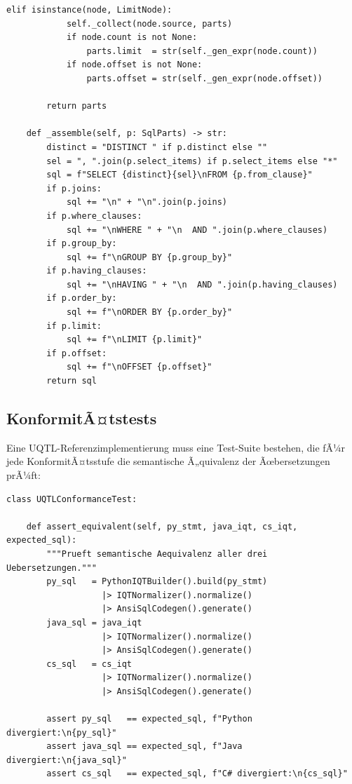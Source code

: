 \begin{lstlisting}[style=pythonstyle, caption={SQL-Codegenerator: IQT nach ANSI SQL},
  label=lst:impl_codegen]
        elif isinstance(node, LimitNode):
            self._collect(node.source, parts)
            if node.count is not None:
                parts.limit  = str(self._gen_expr(node.count))
            if node.offset is not None:
                parts.offset = str(self._gen_expr(node.offset))

        return parts

    def _assemble(self, p: SqlParts) -> str:
        distinct = "DISTINCT " if p.distinct else ""
        sel = ", ".join(p.select_items) if p.select_items else "*"
        sql = f"SELECT {distinct}{sel}\nFROM {p.from_clause}"
        if p.joins:
            sql += "\n" + "\n".join(p.joins)
        if p.where_clauses:
            sql += "\nWHERE " + "\n  AND ".join(p.where_clauses)
        if p.group_by:
            sql += f"\nGROUP BY {p.group_by}"
        if p.having_clauses:
            sql += "\nHAVING " + "\n  AND ".join(p.having_clauses)
        if p.order_by:
            sql += f"\nORDER BY {p.order_by}"
        if p.limit:
            sql += f"\nLIMIT {p.limit}"
        if p.offset:
            sql += f"\nOFFSET {p.offset}"
        return sql
\end{lstlisting}

\subsection{KonformitÃ¤tstests}
\label{subsec:impl_tests}

Eine UQTL-Referenzimplementierung muss eine Test-Suite bestehen, die fÃ¼r
jede KonformitÃ¤tsstufe die semantische Ã„quivalenz der Ãœbersetzungen prÃ¼ft:

\begin{lstlisting}[style=pythonstyle, caption={KonformitÃ¤tstest-Schablone},
  label=lst:impl_test]
class UQTLConformanceTest:

    def assert_equivalent(self, py_stmt, java_iqt, cs_iqt, expected_sql):
        """Prueft semantische Aequivalenz aller drei Uebersetzungen."""
        py_sql   = PythonIQTBuilder().build(py_stmt)
                   |> IQTNormalizer().normalize()
                   |> AnsiSqlCodegen().generate()
        java_sql = java_iqt
                   |> IQTNormalizer().normalize()
                   |> AnsiSqlCodegen().generate()
        cs_sql   = cs_iqt
                   |> IQTNormalizer().normalize()
                   |> AnsiSqlCodegen().generate()

        assert py_sql   == expected_sql, f"Python divergiert:\n{py_sql}"
        assert java_sql == expected_sql, f"Java divergiert:\n{java_sql}"
        assert cs_sql   == expected_sql, f"C# divergiert:\n{cs_sql}"
\end{lstlisting}

